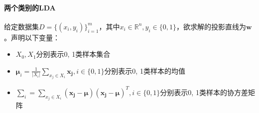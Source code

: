 \paragraph{两个类别的LDA}给定数据集$D = \{(x_i, y_i)\}_{i=1}^{m}$，其中$x_i \in \mathbb{R}^n, y_i \in \{0, 1\}$，欲求解的投影直线为$\boldsymbol{w}$。声明以下变量：
\begin{itemize}
	\item $X_0, X_1$分别表示0, 1类样本集合
	\item $\boldsymbol{\mu}_i = \frac{1}{|X_i|}\sum_{x_j \in X_i} \boldsymbol{x_j}, i\in\{0, 1\}$分别表示0, 1类样本的均值
	\item $\boldsymbol{\sum}_i = \sum_{x_j \in X_i} (\boldsymbol{x_j} - \boldsymbol{\mu}) (\boldsymbol{x_j} - \boldsymbol{\mu})^T, i\in\{0, 1\}$分别表示0, 1类样本的协方差矩阵
\end{itemize}

